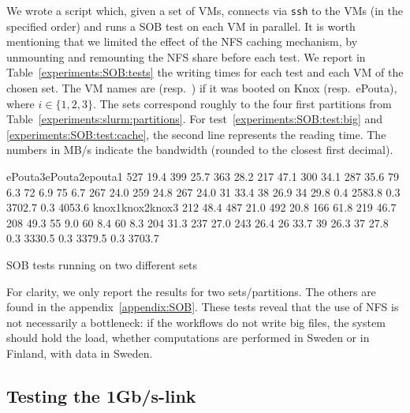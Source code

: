 We wrote a script which, given a set of VMs, connects via \texttt{ssh}
to the VMs (in the specified order) and runs a SOB test on each VM in
parallel.
%
It is worth mentioning that we limited the effect of the NFS caching
mechanism, by unmounting and remounting the NFS share before each
test.
%
We report in Table~\ref{experiments:SOB:tests} the writing times for
each test and each VM of the chosen set.
%
The VM names are  (resp.\ ) if
it was booted on Knox (resp.\ ePouta), where $i\in\{1,2,3\}$.
%
The sets correspond roughly to the four first partitions from
Table~\ref{experiments:slurm:partitions}.
%
For test~\ref{experiments:SOB:test:big} and
\ref{experiments:SOB:test:cache}, the second line represents the
reading time.
%
The numbers in MB/s indicate the bandwidth (rounded to the closest
first decimal).

\begin{table}[!ht]%
\resultpartition%
{{ePouta3}{ePouta2}{epouta1}}%
{{ 527 }{ 19.4   }{ 399 }{ 25.7   }{ 363 }{ 28.2   }}%
{{ 217 }{ 47.1   }{ 300 }{ 34.1   }{ 287 }{ 35.6   }}%
{{  79 }{ 6.3    }{  72 }{ 6.9    }{  75 }{ 6.7    }}%
{{ 267 }{ 24.0   }{ 259 }{ 24.8   }{ 267 }{ 24.0   }}%
{{  31 }{ 33.4   }{  38 }{ 26.9   }{  34 }{ 29.8   }}%
{{ 0.4 }{ 2583.8 }{ 0.3 }{ 3702.7 }{ 0.3 }{ 4053.6 }}
%
\resultpartition%
{{knox1}{knox2}{knox3}}%
{{ 212 }{ 48.4   }{ 487 }{ 21.0   }{ 492 }{ 20.8   }}%
{{ 166 }{ 61.8   }{ 219 }{ 46.7   }{ 208 }{ 49.3   }}%
{{  55 }{ 9.0    }{  60 }{ 8.4    }{  60 }{ 8.3    }}%
{{ 204 }{ 31.3   }{ 237 }{ 27.0   }{ 243 }{ 26.4   }}%
{{  26 }{ 33.7   }{  39 }{ 26.3   }{  37 }{ 27.8   }}%
{{ 0.3 }{ 3330.5 }{ 0.3 }{ 3379.5 }{ 0.3 }{ 3703.7 }}
%
\caption{SOB tests running on two different sets}
\label{experiments:SOB:tests}
\end{table}

For clarity, we only report the results for two sets/partitions. The
others are found in the appendix~\ref{appendix:SOB}. These tests
reveal that the use of NFS is not necessarily a bottleneck: if the
workflows do not write big files, the system should hold the load,
whether computations are performed in Sweden or in Finland, with data
in Sweden.

\subsection{Testing the 1Gb/s-link}
\label{section:experiments:link}


